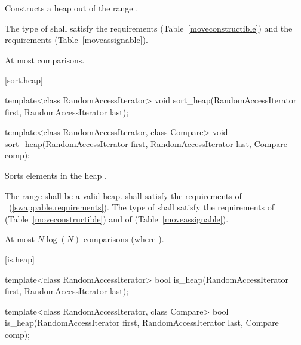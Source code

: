 \begin{itemdescr}
\pnum
\effects
Constructs a heap out of the range
.

\pnum
\requires The type of  shall satisfy
the  requirements
(Table~\ref{moveconstructible}) and the
 requirements
(Table~\ref{moveassignable}).

\pnum
\complexity
At most
comparisons.
\end{itemdescr}

[sort.heap]{}

%
\begin{itemdecl}
template<class RandomAccessIterator>
  void sort_heap(RandomAccessIterator first, RandomAccessIterator last);

template<class RandomAccessIterator, class Compare>
  void sort_heap(RandomAccessIterator first, RandomAccessIterator last,
                 Compare comp);
\end{itemdecl}

\begin{itemdescr}
\pnum
\effects
Sorts elements in the heap
.

\pnum
\requires The range  shall be a valid heap.
 shall satisfy the requirements of
~(\ref{swappable.requirements}). The type
of  shall satisfy the requirements of
 (Table~\ref{moveconstructible}) and of
 (Table~\ref{moveassignable}).


\pnum
\complexity
At most $N \log(N)$
comparisons (where
).
\end{itemdescr}

[is.heap]{}

%
\begin{itemdecl}
  template<class RandomAccessIterator>
    bool is_heap(RandomAccessIterator first, RandomAccessIterator last);
\end{itemdecl}


\begin{itemdescr}
\pnum
\returns {}
\end{itemdescr}

%
\begin{itemdecl}
  template<class RandomAccessIterator, class Compare>
    bool is_heap(RandomAccessIterator first, RandomAccessIterator last, Compare comp);
\end{itemdecl}


